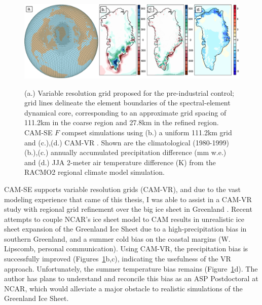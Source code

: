 \begin{figure}[t]
\begin{center}
\noindent\includegraphics[width=33pc,angle=0]{chapter7/asp_panel.png}\\
\end{center}
\caption{(a.) Variable resolution grid proposed for the pre-industrial control; grid lines delineate the element boundaries of the spectral-element dynamical core, corresponding to an approximate grid spacing of 111.2km in the coarse region and 27.8km in the refined region. CAM-SE $F$ compset simulations using (b.) a uniform 111.2km grid and (c.),(d.) CAM-VR \citep{VETAL2018TC}. Shown are the climatological (1980-1999) (b.),(c.) annually accumulated precipitation difference (mm w.e.) and (d.) JJA 2-meter air temperature difference (K) from the RACMO2 regional climate model simulation.}
\label{fig:se-mesh}
\end{figure}

CAM-SE supports variable resolution grids (CAM-VR), and due to the vast modeling experience that came of this thesis, I was able to assist in a CAM-VR study with regional grid refinement over the big ice sheet in Greenland \citep[Figure~\ref{fig:se-mesh}a;][]{VETAL2018TC}. Recent attempts to couple NCAR's ice sheet model to CAM results in unrealistic ice sheet expansion of the Greenland Ice Sheet due to a high-precipitation bias in southern Greenland, and a summer cold bias on the coastal margins (W. Lipscomb, personal communication). Using CAM-VR, the precipitation bias is successfully improved (Figures~\ref{fig:se-mesh}b,c), indicating the usefulness of the VR approach. Unfortunately, the summer temperature bias remains (Figure~\ref{fig:se-mesh}d). The author has plans to understand and reconcile this bias as an ASP Postdoctoral at NCAR, which would alleviate a major obstacle to realistic simulations of the Greenland Ice Sheet.